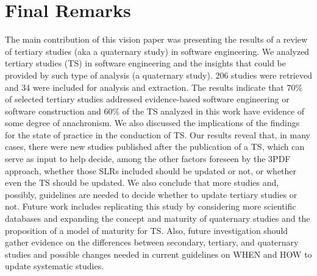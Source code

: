 \documentclass[sigconf]{acmart}
\begin{document}
\section{Final Remarks}
\label{sec:finalremarks}

The main contribution of this vision paper was presenting the results of a review of tertiary studies (aka a quaternary study) in software engineering. We analyzed tertiary studies (TS) in software engineering and the insights that could be provided by such type of analysis (a quaternary study). 206 studies were retrieved and 34 were included for analysis and extraction. The results indicate that 70\% of selected tertiary studies addressed evidence-based software engineering or software construction and 60\% of the TS analyzed in this work have evidence of some degree of anachronism. We also discussed the implications of the findings for the state of practice in the conduction of TS. Our results reveal that, in many cases, there were new studies published after the publication of a TS, which can serve as input to help decide, among the other factors foreseen by the 3PDF approach, whether those SLRs included should be updated or not, or whether even the TS should be updated. We also conclude that more studies and, possibly, guidelines are needed to decide whether to update tertiary studies or not.  %
Future work includes replicating this study by considering more scientific databases and expanding the concept and maturity of quaternary studies and the proposition of a model of maturity for TS. Also, future investigation should gather evidence on the differences between secondary, tertiary, and quaternary studies and possible changes needed in current guidelines on WHEN and HOW to update systematic studies.




\vspace{-0.2cm}
\appendix
\end{document}
